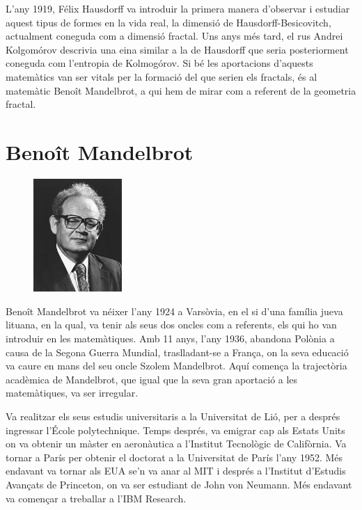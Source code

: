 \documentclass[12pt,a4paper]{report}
\begin{document}
L'any 1919, Félix Hausdorff va introduir la primera manera d'observar i estudiar aquest tipus de formes en la vida real, la dimensió de Hausdorff-Besicovitch, actualment coneguda com a dimensió fractal. Uns anys més tard, el rus Andrei Kolgomórov descrivia una eina similar a la de Hausdorff que seria posteriorment coneguda com l'entropia de Kolmogórov. Si bé les aportacions d'aquests matemàtics van ser vitals per la formació del que serien els fractals, és al matemàtic Benoît Mandelbrot, a qui hem de mirar com a referent de la geometria fractal.
\section{Benoît Mandelbrot}
\begin{figure}
  \begin{center}\vspace{-25pt}
    \includegraphics[width=0.3\textwidth]{img/img01_03_mandelbrot.jpeg}
  \end{center}
\end{figure}
Benoît Mandelbrot \cite{Wikipedia2024:Mandelbrot} va néixer l'any 1924 a Varsòvia, en el si d’una família jueva lituana, en la qual, va tenir als seus dos oncles com a referents, els qui ho van introduir en les matemàtiques. Amb 11 anys, l'any 1936, abandona Polònia a causa de la Segona Guerra Mundial, traslladant-se a França, on la seva educació va caure en mans del seu oncle Szolem Mandelbrot. Aquí comença la trajectòria acadèmica de Mandelbrot, que igual que la seva gran aportació a les matemàtiques, va ser irregular. 

Va realitzar els seus estudis universitaris a la Universitat de Lió, per a després ingressar l’École polytechnique. Temps després, va emigrar cap als Estats Units on va obtenir un màster en aeronàutica a l'Institut Tecnològic de Califòrnia. Va tornar a París per obtenir el doctorat a la Universitat de París l'any 1952. Més endavant va tornar als EUA se'n va anar al MIT i després a l'Institut d'Estudis Avançats de Princeton, on va ser estudiant de John von Neumann. Més endavant va començar a treballar a l'IBM Research.
\end{document}
